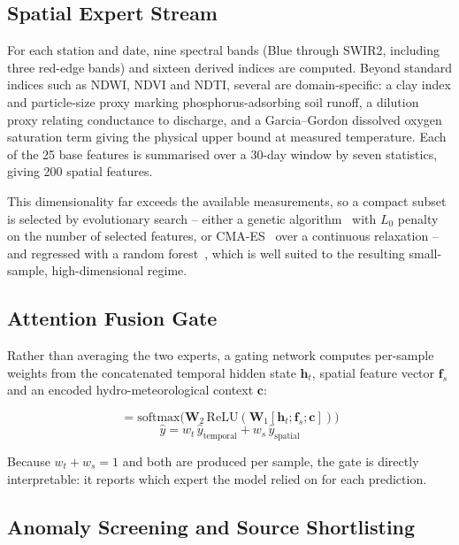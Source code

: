 \documentclass[conference]{IEEEtran}
\begin{document}
\subsection{Spatial Expert Stream}

For each station and date, nine spectral bands (Blue through SWIR2, including
three red-edge bands) and sixteen derived indices are computed. Beyond standard
indices such as NDWI, NDVI and NDTI, several are domain-specific: a clay index
and particle-size proxy marking phosphorus-adsorbing soil runoff, a dilution
proxy relating conductance to discharge, and a Garcia--Gordon dissolved oxygen
saturation term giving the physical upper bound at measured temperature. Each
of the 25 base features is summarised over a 30-day window by seven statistics,
giving 200 spatial features.

This dimensionality far exceeds the available measurements, so a compact subset
is selected by evolutionary search -- either a genetic
algorithm~\cite{holland} with $L_0$ penalty on the number of selected
features, or CMA-ES~\cite{hansen} over a continuous relaxation -- and regressed
with a random forest~\cite{breiman}, which is well suited to the resulting
small-sample, high-dimensional regime.

\subsection{Attention Fusion Gate}

Rather than averaging the two experts, a gating network computes per-sample
weights from the concatenated temporal hidden state $\mathbf{h}_t$, spatial
feature vector $\mathbf{f}_s$ and an encoded hydro-meteorological context
$\mathbf{c}$:

\begin{equation}
[w_t, w_s] = \mathrm{softmax}\big(\mathbf{W}_2\,\mathrm{ReLU}(\mathbf{W}_1[\mathbf{h}_t;\mathbf{f}_s;\mathbf{c}])\big)
\end{equation}
\begin{equation}
\hat{y} = w_t\,\hat{y}_{\text{temporal}} + w_s\,\hat{y}_{\text{spatial}}
\end{equation}

Because $w_t + w_s = 1$ and both are produced per sample, the gate is directly
interpretable: it reports which expert the model relied on for each prediction.

\subsection{Anomaly Screening and Source Shortlisting}
\end{document}
